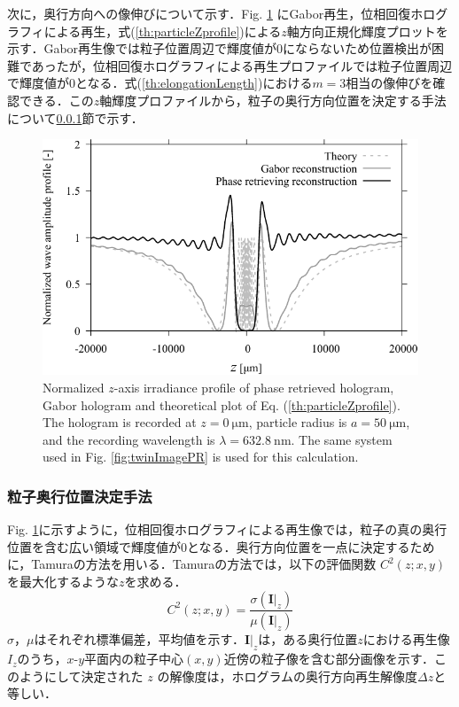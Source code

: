 次に，奥行方向への像伸びについて示す．Fig. \ref{fig:particlePRZprofile} にGabor再生，位相回復ホログラフィによる再生，式(\ref{th:particleZprofile})による$z$軸方向正規化輝度プロットを示す．Gabor再生像では粒子位置周辺で輝度値が0にならないため位置検出が困難であったが，位相回復ホログラフィによる再生プロファイルでは粒子位置周辺で輝度値が0となる．式(\ref{th:elongationLength})における$m=3$相当の像伸びを確認できる．この$z$軸輝度プロファイルから，粒子の奥行方向位置を決定する手法について\ref{sec:particleDepth}節で示す．
\begin{figure}[htbp]
    \centering
    \includegraphics[width=0.8\linewidth]{./Figure/2_Theory/przprofile.pdf}
    \caption{Normalized $z$-axis irradiance profile of phase retrieved hologram, Gabor hologram and theoretical plot of Eq. (\ref{th:particleZprofile}). The hologram is recorded at $z = \SI{0}{\um}$, particle radius is $a=\SI{50}{\um}$, and the recording wavelength is $\lambda = \SI{632.8}{\nm}$. The same system used in Fig. \ref{fig:twinImagePR} is used for this calculation.}
    \label{fig:particlePRZprofile}
\end{figure}

\subsubsection{粒子奥行位置決定手法}\label{sec:particleDepth}
Fig. \ref{fig:particlePRZprofile}に示すように，位相回復ホログラフィによる再生像では，粒子の真の奥行位置を含む広い領域で輝度値が0となる．奥行方向位置を一点に決定するために，Tamuraの方法を用いる\cite{memmolo2011}．Tamuraの方法では，以下の評価関数 $C^2(z;x,y)$ を最大化するような$z$を求める．
\begin{equation}
    \label{th:tamura}
    C^2(z;x,y) = \frac{\sigma{\left( \bm{I}|_z \right)}}{\mu{\left( \bm{I}|_z \right)}}
\end{equation}
$\sigma$，$\mu$はそれぞれ標準偏差，平均値を示す．$\bm{I}|_z$は，ある奥行位置$z$における再生像$I_z$のうち，$x$-$y$平面内の粒子中心$(x,y)$近傍の粒子像を含む部分画像を示す．このようにして決定された $z$ の解像度は，ホログラムの奥行方向再生解像度$\Delta z$と等しい．

